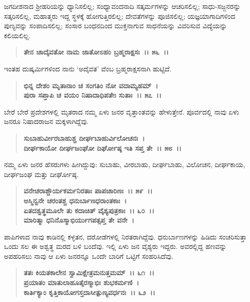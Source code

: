 ಜಗದೀಶನಾದ ಶ‍್ರೀಹರಿಯನ್ನು ಧ್ಯಾನಿಸಲಿಲ್ಲ; ಸಂಧ್ಯಾವಂದನಾದಿ ಸತ್ಕರ್ಮಗಳನ್ನು ಆಚರಿಸಲಿಲ್ಲ; ಸಾಧು-ಸಜ್ಜನರನ್ನು ಸತ್ಕರಿಸಲಿಲ್ಲ, ಮಹಾತ್ಮರು ಇದ್ದ ಸ್ಥಳಕ್ಕೆ ಹೋಗುತ್ತಿರಲಿಲ್ಲ; ದೇವತೆಗಳನ್ನು ಪೂಜಿಸಲಿಲ್ಲ; ಯಜ್ಞಯಾಗಾದಿಗಳಿಂದ ಪುಣ್ಯವನ್ನು ಸಂಪಾದಿಸಲಿಲ್ಲ; ಸಂಸಾರ ಬಂಧನದಿಂದ ಮುಕ್ತನಾಗುವ ಸಾಧನೆಯನ್ನು ವಿವರಿಸುವ ವಿದ್ಯೆಯನ್ನು ಕಲಿಯಲಿಲ್ಲ.

\begin{verse}
\textbf{ತೇನ ಚಾದೈವತೋ ನಾಮ ಜಾತೋಽಹಂ ಬ್ರಹ್ಮರಾಕ್ಷಸಃ~।। ೫೬~।।}
\end{verse}

ಇಂತಹ ದುಷ್ಕರ್ಮಿಗಳಿಂದ ನಾನು `ಅದೈವತ' ವೆಂಬ ಬ್ರಹ್ಮರಾಕ್ಷಸನಾಗಿ ಹುಟ್ಟಿದೆ.

\begin{verse}
\textbf{ಭಿನ್ನ ದೇಶಂ ಮೃತಾನಾಂ ಚ ಸಂಗತಿಂ ನೋ ವದಾಮ್ಯಹಮ್~।}\\\textbf{ಪುರಾ ಸಪ್ತಾಪಿ ಚ ವಯಂ ನಿಷಾದಾಧಿಪತೇಃ ಸುತಾಃ~।। ೫೭~।।}
\end{verse}

ಬೇರೆ ಬೇರೆ ಪ್ರದೇಶಗಳಲ್ಲಿ ಮೃತರಾದ ನಮ್ಮ ಏಳು ಜನರ ವೃತ್ತಾಂತವನ್ನು ಹೇಳುತ್ತೇನೆ. ಪೂರ್ವದಲ್ಲಿ ನಾವು ಏಳು ಜನರೂ ನಿಷಾದರಾಜನ ಮಕ್ಕಳಾಗಿದ್ದೆವು.

\begin{verse}
\textbf{ಸುಬಾಹುರ್ವೀರಬಾಹುಶ್ಚ ದೀರ್ಘಬಾಹುರ್ವಿಲೋಚನಃ~।}\\\textbf{ದೀರ್ಘಕಾಯೋ ದೀರ್ಘಜಂಘೋ ದಿರ್ಘೋಷ್ಠ ಇತಿ ಸಪ್ತ ತೇ~।। ೫೮~।।}
\end{verse}

ನಮ್ಮ ಏಳು ಜನರ ಹೆಸರುಗಳು ಹೀಗಿದ್ದುವು: ಸುಬಾಹು, ವೀರಬಾಹು, ದೀರ್ಘಬಾಹು, ವಿಲೋಚನ, ದೀರ್ಘಕಾಯ, ದೀರ್ಘಜಂಘ ಮತ್ತು ದೀರ್ಘೋಷ್ಠ.

\begin{verse}
\textbf{ವನೇಚರಾಶ್ಚೌರ್ಯಕರ್ಮನಿರತಾಃ ಪಾಪಚಾರಿಣಃ~।। ೫೯~।।}\\\textbf{ಅಸ್ಮಿನ್ವನೇ ಚರಂತಶ್ಚ ಧನುರ್ಬಾಣಧರಾಂತಕಾಃ~। }\\\textbf{ಏತದಶ್ವತ್ಥಮೂಲೇ ತು ಕದಾಚಿತ್ ವೈಶ್ಯಪುತ್ರಕಾಃ~।। ೬೦~।।} \\\textbf{ಮಾರಿತ್ಮಾ ಧನಿನೊಸ್ಮಾಭಿರ್ಯುಗಪತ್ಸಪ್ತ ತೇ ವನೇ~।}
\end{verse}

ಪಾಪಿಗಳಾದ ನಾವು ಕಾಡಿನಲ್ಲಿ ಕಳ್ಳತನ, ದರೋಡೆಗಳಲ್ಲಿ ನಿರತರಾಗಿದ್ದೆವು. ಧನುರ್ಬಾಣಗಳನ್ನು ಹಿಡಿದು ಸಂಚರಿಸುತ್ತಾ ಒಂದು ಸಲ ಈ ಅಶ್ವತ್ಥ ಮರದ ಬಳಿ ಬಂದೆವು. ಇಲ್ಲಿ ಏಳು ಜನ ವೈಶ್ಯರು ಇದ್ದರು. ಅವರಲ್ಲಿದ್ದ ಹಣವನ್ನು ಅಪಹರಿಸಲು ನಾವು ಆ ಏಳು ಜನರನ್ನೂ ಒಂದೇ ಬಾರಿಗೆ ಒಟ್ಟಿಗೆ ಸಂಹರಿಸಿದೆವು.

\begin{verse}
\textbf{ತತಃ ಕಿಯತಕಾಲೇನ ಸ್ವಾಮಿಕ್ಷೇತ್ರಮನುತ್ತಮಮ್~।। ೬೧~।।}\\\textbf{ಪ್ರಯಾತಂ ಮಾತುಲಾಹೂತೈರಸ್ಮಾಭಿಃ ಶುಭಕರ್ಮಣಿ~। }\\\textbf{ಕಾರ್ತಿಕ್ಯಾಂ ಕೃತ್ತಿಕಾಯೋಗಸ್ತದಾಸೀತ್ಪುಣ್ಯವರ್ಧನಃ~।। ೬೨~।।}
\end{verse}

